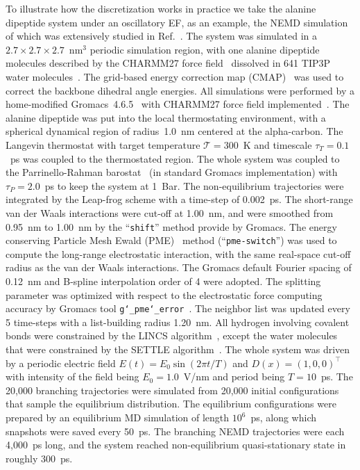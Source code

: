 \documentclass[journal=jctcce,manuscript=article]{achemso}
\newcommand{\redc}[1]{{\color{red} #1}}
\begin{document}
To illustrate how the discretization works in practice we take the alanine dipeptide system under an oscillatory EF,
as an example, the NEMD simulation of which was
extensively studied in Ref.~\cite{wang2014exploring}.
The system was simulated in a $2.7\times 2.7\times 2.7$~$\textrm{nm}^3$ periodic simulation
region, with one alanine dipeptide molecules described by the CHARMM27 force field~\cite{foloppe2000all} dissolved in 641 TIP3P water molecules~\cite{jorgensen1983comparison}.
The grid-based energy correction map (CMAP)~\cite{mackerell2004extending} was used
to correct the backbone dihedral angle energies.
All simulations were performed by a home-modified
Gromacs~4.6.5~\cite{pronk2013gromacs} with CHARMM27 force field implemented~\cite{bjelkmar2010implementation}.
The alanine dipeptide was put into the local thermostating
environment, with a spherical dynamical region of radius~1.0~nm
centered at the alpha-carbon.
The Langevin thermostat with target temperature $\mathcal T = 300$~K
and timescale $\tau_T = 0.1$~ps was
coupled to the thermostated region.
The whole system was coupled to the Parrinello-Rahman barostat~\cite{parrinello1981polymorphic} (in standard Gromacs implementation) with $\tau_P = 2.0$~ps to
keep the system at 1~Bar. The non-equilibrium trajectories
were integrated by the Leap-frog scheme with a time-step of 0.002~ps.
The short-range van der Waals interactions were cut-off at 1.00~nm, and were smoothed from
0.95~nm to 1.00~nm by the ``\texttt{shift}'' method provide by Gromacs.
The energy conserving 
Particle Mesh Ewald (PME)~\cite{darden1993pme, essmann1995spm} method (``\texttt{pme-switch}'') was
used to compute the long-range electrostatic interaction,
with the same real-space cut-off radius as the van der Waals interactions.
The Gromacs default Fourier spacing of 0.12~nm and B-spline interpolation order of 4 were adopted.
The splitting
parameter was optimized with respect to the electrostatic force computing
accuracy by Gromacs tool \texttt{g\char`_pme\char`_error}~\cite{wang2010optimizing}.
The neighbor list was updated every 5 time-steps with a list-building radius 1.20~nm.
All hydrogen involving covalent bonds were constrained by the LINCS algorithm~\cite{hess1997lincs}, except the water molecules that were constrained by the SETTLE algorithm~\cite{miyamoto2004settle}.
The whole system was driven by a periodic electric field
$E(t) = E_0\sin(2\pi t/T)$ and $D(x) = (1,0,0)^{\top}$
with intensity of the field being $E_0 = 1.0$~V/nm and period being
$T = 10$~ps.
The 20,000 branching trajectories were simulated from 20,000
initial configurations that sample the equilibrium distribution.
The equilibrium configurations were prepared by an equilibrium MD simulation
of length $10^6$~ps, along which snapshots were saved every 50~ps.
The branching NEMD
trajectories were each 4,000~ps long, and the system reached
non-equilibrium quasi-stationary state in roughly 300~ps.
\end{document}
